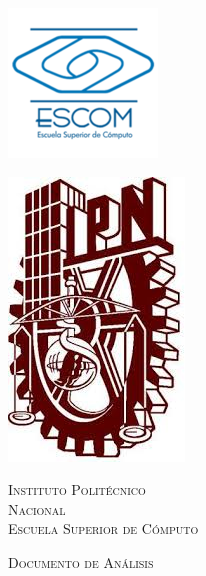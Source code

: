 \begin{center}																
	\newcommand{\HRule}{\rule{\linewidth}{0.5mm}}							
	\begin{minipage}{0.48\textwidth}
    	\begin{flushleft}
			\includegraphics[scale = 0.63]{imagenes/logoescom}
		\end{flushleft}
	\end{minipage}
	\begin{minipage}{0.48\textwidth}
		\begin{flushright}
			\includegraphics[scale = 0.35]{imagenes/IPN}
		\end{flushright}
	\end{minipage}
	\vspace*{-1.5cm}
  
	\textsc{
		\huge Instituto Politécnico\\ 
		\vspace{5px} Nacional
	}\\[1.5cm]	
	\textsc{
		\LARGE Escuela Superior de Cómputo
	}\\[1.5cm]

	\begin{minipage}{0.9\textwidth} 
		\begin{center}
			\textsc{\LARGE Documento de Análisis}
		\end{center}
	\end{minipage}\\[0.5cm]


\end{center}
